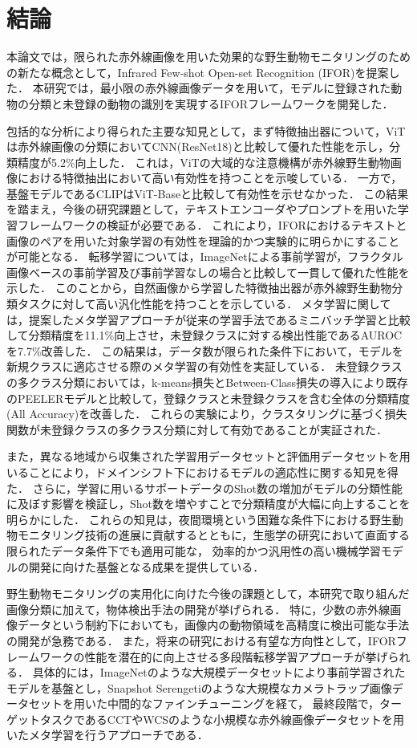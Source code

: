 
\chapter{結論}

本論文では，限られた赤外線画像を用いた効果的な野生動物モニタリングのための新たな概念として，Infrared Few-shot Open-set Recognition (IFOR)を提案した．
本研究では，最小限の赤外線画像データを用いて，モデルに登録された動物の分類と未登録の動物の識別を実現するIFORフレームワークを開発した．

包括的な分析により得られた主要な知見として，まず特徴抽出器について，ViTは赤外線画像の分類においてCNN(ResNet18)と比較して優れた性能を示し，分類精度が5.2\%向上した．
これは，ViTの大域的な注意機構が赤外線野生動物画像における特徴抽出において高い有効性を持つことを示唆している．
一方で，基盤モデルであるCLIPはViT-Baseと比較して有効性を示せなかった．
この結果を踏まえ，今後の研究課題として，テキストエンコーダやプロンプトを用いた学習フレームワークの検証が必要である．
これにより，IFORにおけるテキストと画像のペアを用いた対象学習の有効性を理論的かつ実験的に明らかにすることが可能となる．
転移学習については，ImageNetによる事前学習が，フラクタル画像ベースの事前学習及び事前学習なしの場合と比較して一貫して優れた性能を示した．
このことから，自然画像から学習した特徴抽出器が赤外線野生動物分類タスクに対して高い汎化性能を持つことを示している．
メタ学習に関しては，提案したメタ学習アプローチが従来の学習手法であるミニバッチ学習と比較して分類精度を11.1\%向上させ，未登録クラスに対する検出性能であるAUROCを7.7\%改善した．
この結果は，データ数が限られた条件下において，モデルを新規クラスに適応させる際のメタ学習の有効性を実証している．
未登録クラスの多クラス分類においては，k-means損失とBetween-Class損失の導入により既存のPEELERモデルと比較して，登録クラスと未登録クラスを含む全体の分類精度(All Accuracy)を改善した．
これらの実験により，クラスタリングに基づく損失関数が未登録クラスの多クラス分類に対して有効であることが実証された．

また，異なる地域から収集された学習用データセットと評価用データセットを用いることにより，ドメインシフト下におけるモデルの適応性に関する知見を得た．
さらに，学習に用いるサポートデータのShot数の増加がモデルの分類性能に及ぼす影響を検証し，Shot数を増やすことで分類精度が大幅に向上することを明らかにした．
これらの知見は，夜間環境という困難な条件下における野生動物モニタリング技術の進展に貢献するとともに，生態学の研究において直面する限られたデータ条件下でも適用可能な，
効率的かつ汎用性の高い機械学習モデルの開発に向けた基盤となる成果を提供している．

野生動物モニタリングの実用化に向けた今後の課題として，本研究で取り組んだ画像分類に加えて，物体検出手法の開発が挙げられる．
特に，少数の赤外線画像データという制約下においても，画像内の動物領域を高精度に検出可能な手法の開発が急務である．
また，将来の研究における有望な方向性として，IFORフレームワークの性能を潜在的に向上させる多段階転移学習アプローチが挙げられる．
具体的には，ImageNetのような大規模データセットにより事前学習されたモデルを基盤とし，Snapshot Serengetiのような大規模なカメラトラップ画像データセットを用いた中間的なファインチューニングを経て，
最終段階で，ターゲットタスクであるCCTやWCSのような小規模な赤外線画像データセットを用いたメタ学習を行うアプローチである．